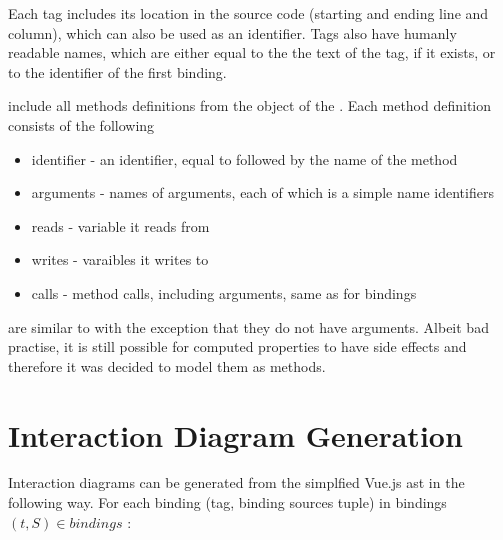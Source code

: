 Each tag includes its location in the source code (starting and ending line and column), which can also be used as an identifier. Tags also have humanly readable names, which are either equal to the the text of the tag, if it exists, or to the identifier of the first binding. 

 include all methods definitions from the  object of the . Each method definition consists of the following
\begin{itemize}
    \item identifier - an identifier, equal to  followed by the name of the method
    \item arguments - names of arguments, each of which is a simple name identifiers
    \item reads - variable it reads from
    \item writes - varaibles it writes to
    \item calls - method calls, including arguments, same as for bindings 
\end{itemize}

 are similar to  with the exception that they do not have arguments. Albeit bad practise, it is still possible for computed properties to have side effects and therefore it was decided to model them as methods.

\section{Interaction Diagram Generation}
Interaction diagrams can be generated from the simplfied Vue.js \gls{ast} in the following way.
For each binding (tag, binding sources tuple) in bindings $(t,S) \in bindings$ :

